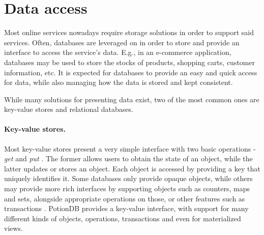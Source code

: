 




\section{Data access}
\label{sec:data_access}

Most online services nowadays require storage solutions in order to support said services.
Often, databases are leveraged on in order to store and provide an interface to access the service's data.
E.g., in an e-commerce application, databases may be used to store the stocks of products, shopping carts, customer information, etc.
It is expected for databases to provide an easy and quick access for data, while also managing how the data is stored and kept consistent.

While many solutions for presenting data exist, two of the most common ones are key-value stores and relational databases.

\paragraph{Key-value stores.}
Most key-value stores present a very simple interface with two basic operations - \emph{get} and \emph{put} \cite{dynamo, cops, cure, walter, pequod}.	%
The former allows users to obtain the state of an object, while the latter updates or stores an object.
Each object is accessed by providing a key that uniquely identifies it.
Some databases only provide opaque objects, while others may provide more rich interfaces by supporting objects such as counters, maps and sets, alongside appropriate operations on those, or other features such as transactions \cite{cure, walter, pequod}.	%
PotionDB provides a key-value interface, with support for many different kinds of objects, operations, transactions and even for materialized views.

